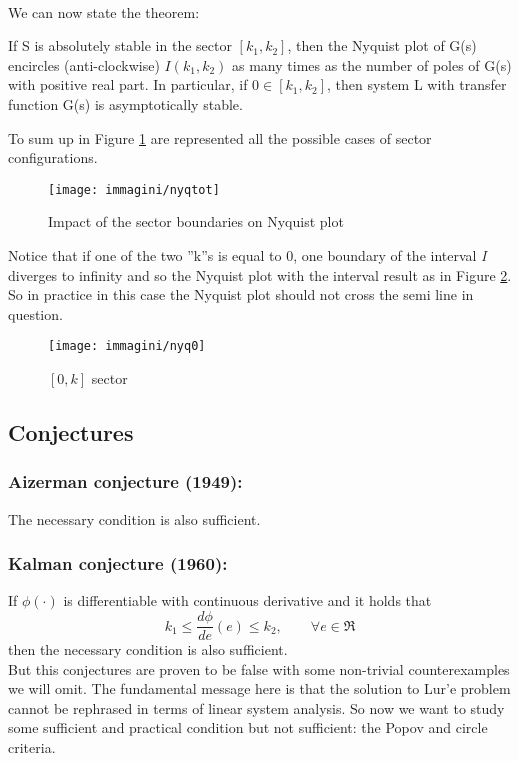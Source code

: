\\ We can now state the theorem:
\begin{thm}
	If S is absolutely stable in the sector $[k_1, k_2]$, then the Nyquist plot of G(s) encircles (anti-clockwise) $I(k_1,k_2)$ as many times as the number of poles of G(s) with positive real part.
	In particular, if $0\in[k_1, k_2]$, then system L with transfer function G(s) is asymptotically stable.
\end{thm}
To sum up in Figure \ref{fig:nyqtot} are represented all the possible cases of sector configurations.
\begin{figure}[H]
	\centering
	\texttt{[image: immagini/nyqtot]}
	\caption{Impact of the sector boundaries on Nyquist plot}
	\label{fig:nyqtot}
\end{figure}
 Notice that if one of the two ''k''s is equal to 0, one boundary of the interval \emph{I} diverges to infinity and so the Nyquist plot with the interval result as in Figure \ref{fig:nyq0}. So in practice in this case the Nyquist plot should not cross the semi line in question.
\begin{figure}[H]
 	\centering
 	\texttt{[image: immagini/nyq0]}
 	\caption{$[0,k]$ sector}
 	\label{fig:nyq0}
\end{figure}
\subsection{Conjectures}
\subsubsection{Aizerman conjecture (1949):}
The necessary condition is also sufficient.
\subsubsection{Kalman conjecture (1960):}
If $\phi(\cdot)$ is differentiable with continuous derivative and it holds that 
\[
k_1\le\frac{d\phi}{de}(e)\le k_2, \qquad \forall e\in\Re
\]then the necessary condition is also sufficient.\\
But this conjectures are proven to be false with some non-trivial counterexamples we will omit. The fundamental message here is that the solution to Lur'e problem cannot be rephrased in terms of linear system analysis.
\linebreak
So now we want to study some sufficient and practical condition but not sufficient: the Popov and circle criteria.
